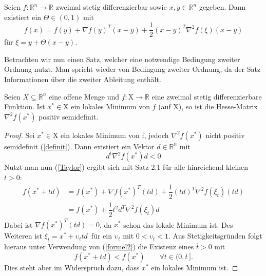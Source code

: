 \documentclass[a4paper,10pt]{scrartcl}
\begin{document}
\begin{erinnerung}
	Seien $f : \mathbb{R}^{n} \longrightarrow \mathbb{R}$ zweimal stetig differenzierbar sowie $x,y \in \mathbb{R}^{n}$ gegeben. Dann existiert ein $\Theta \in (0,1)$ mit 
	\begin{equation}
	f(x) = f(y) + \nabla f(y)^{T}(x-y)+\dfrac{1}{2}(x-y)^{T} \nabla^{2}f(\xi)(x-y)
	\label{Taylor}
	\end{equation}
	für $\xi= y+\Theta(x-y)$.
\end{erinnerung}

Betrachten wir nun einen Satz, welcher eine notwendige Bedingung zweiter Ordnung nutzt. Man spricht wieder von Bedingung zweiter Ordnung, da der Satz Informationen über die zweiter Ableitung enthält.

\begin{satz}
	Seien $ X \subseteq \mathbb{R}^n $ eine offene Menge und $ f:\mathrm{X} \longrightarrow \mathbb{R} $ eine zweimal stetig differenzierbare Funktion. Ist  $ x^{*} \in \mathrm{X} $ ein lokales Minimum von $f$ (auf $ \mathrm{X} $), so ist die Hesse-Matrix $\nabla^{2}f(x^{*})$ positiv semidefinit.
\end{satz}
\begin{proof}
	Sei $x^{*} \in \mathrm{X}$ ein lokales Minimum von f, jedoch $\nabla^{2}f(x^{*})$ nicht positiv semidefinit (\ref{definit}). Dann existiert ein Vektor $d \in \mathbb{R}^{n}$ mit 
	\begin{equation}
	d^{t}\nabla^{2}f(x^{*})d <0
	\label{formel2}
	\end{equation}
	Nutzt man nun (\ref{Taylor}) ergibt sich mit Satz 2.1 für alle hinreichend kleinen $t>0$:
	\begin{equation*}
	\begin{split}
	f(x^{*}+td)  &= f(x^{*}) + \nabla f(x^{*})^{T}(td) + \dfrac{1}{2}(td)^{T} \nabla^{2} f(\xi_{t})(td) \\
	&= f(x^{*}) + \dfrac{1}{2}t^{2}d^{T} \nabla^{2} f(\xi_{t})d 
	\end{split}
	\end{equation*}
	Dabei ist $\nabla f(x^{*})^{T}(td) = 0$, da $x^{*}$ schon das lokale Minimum ist. Des Weiteren ist $\xi_{t} = x^{*} + \upsilon_{t}td \,$ für ein $\upsilon_{t}$ mit $0 < \upsilon_{t} < 1$. Aus Stetigkeitsgründen folgt hieraus unter Verwendung von (\ref{formel2}) die Existenz eines $\overline{t} > 0$ mit 
	\begin{equation*}
	f(x^{*}+td)<f(x^{*}) \qquad \forall t \in (0,\overline{t} \,] .
	\end{equation*}
	Dies steht aber im Widerspruch dazu, dass $x^{*}$ ein lokales Minimum ist.
\end{proof}
\end{document}
